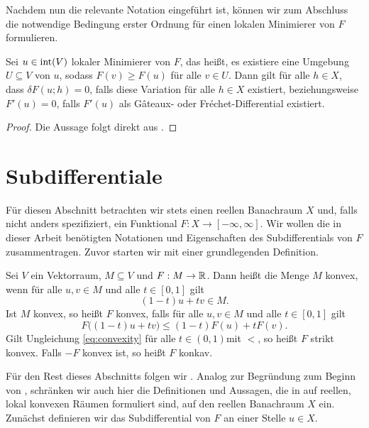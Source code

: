Nachdem nun die relevante Notation eingeführt ist, können wir zum Abschluss
die notwendige Bedingung erster Ordnung für einen lokalen Minimierer von $F$
formulieren.

\begin{theorem}
  \label{thm:necessaryConditionFreeLocalExtrema}
  Sei $u\in \operatorname{int}(V)$ lokaler Minimierer von $F$, das heißt, es existiere
  eine Umgebung $U\subseteq V$ von $u$, sodass $F(v)\geq F(u)$ für alle $v\in
  U$. 
  Dann gilt für alle $h\in X$, dass $\delta F(u;h) = 0$, falls diese Variation
  für alle $h\in X$ existiert, beziehungsweise $F'(u) = 0$, falls $F'(u)$ als
  G\^ateaux- oder Fr\'echet-Differential existiert.
\end{theorem}

\begin{proof}
  Die Aussage folgt direkt aus \cite[S. 193 f., Theorem 40.A, Theorem
  40.B]{Zei85}.
\end{proof}


\section{Subdifferentiale}

Für diesen Abschnitt betrachten wir stets einen reellen Banachraum $X$ und,
falls nicht anders spezifiziert, ein Funktional $F:X\to [-\infty,\infty]$.
Wir wollen die in dieser Arbeit benötigten Notationen und
Eigenschaften des Subdifferentials von $F$ zusammentragen.
Zuvor starten wir mit einer grundlegenden Definition.

\begin{definition}
  Sei $V$ ein Vektorraum, $M\subseteq V$ und $F:M\to\mathbb{R}$. 
  Dann heißt die Menge $M$ konvex, wenn für alle $u,v\in M$ und alle $t\in
  [0,1]$ gilt $$(1-t)u+tv\in M.$$
  Ist $M$ konvex, so heißt $F$ konvex, falls für alle $u,v\in M$ und alle
  $t\in[0,1]$ gilt 
  \begin{equation}
    \label{eq:convexity}
    F\big( (1-t)u+tv\big)\leq (1-t)F(u)+t F(v).
  \end{equation}
  Gilt Ungleichung \eqref{eq:convexity} für alle $t\in
  (0,1)$mit \glqq$<$\grqq, so heißt $F$ strikt konvex. 
  Falls $-F$ konvex ist, so heißt $F$ konkav.
\end{definition}

Für den Rest dieses Abschnitts folgen wir \cite[S. 385-397]{Zei85}. 
Analog zur Begründung zum Beginn von , schränken
wir auch hier die Definitionen und Aussagen, die in \cite{Zei85} auf reellen,
lokal konvexen Räumen formuliert sind, auf den reellen Banachraum $X$ ein.
Zunächst definieren wir das Subdifferential von $F$ an einer Stelle $u\in X$.

